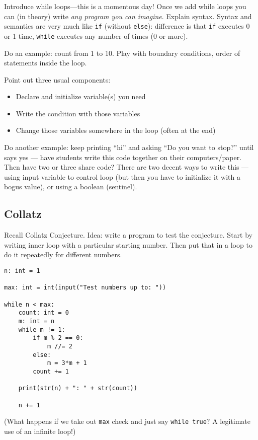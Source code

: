 \documentclass{article}
\begin{document}
Introduce while loops---this is a momentous day!  Once we add while
loops you can (in theory) write \emph{any program you can imagine}.
Explain syntax.  Syntax and semantics are very much like \verb|if|
(without \verb|else|): difference is that \verb|if| executes 0 or 1
time, \verb|while| executes any number of times (0 or more).

Do an example: count from 1 to 10.  Play with boundary conditions,
order of statements inside the loop.

Point out three usual components:
\begin{itemize}
\item Declare and initialize variable(s) you need
\item Write the condition with those variables
\item Change those variables somewhere in the loop (often at the
  end)
\end{itemize}

Do another example: keep printing ``hi'' and asking ``Do you want to
stop?'' until says yes --- have students write this code together on
their computers/paper.  Then have two or three share code?  There are
two decent ways to write this --- using input variable to control loop
(but then you have to initialize it with a bogus value), or using a
boolean (sentinel).

\subsection*{Collatz}

Recall Collatz Conjecture.  Idea: write a program to test the
conjecture.  Start by writing inner loop with a particular starting
number.  Then put that in a loop to do it repeatedly for different
numbers.

\begin{verbatim}
n: int = 1

max: int = int(input("Test numbers up to: "))

while n < max:
    count: int = 0
    m: int = n
    while m != 1:
        if m % 2 == 0:
            m //= 2
        else:
            m = 3*m + 1
        count += 1

    print(str(n) + ": " + str(count))

    n += 1
\end{verbatim}

(What happens if we take out \verb|max| check and just say
\verb|while true|?  A legitimate use of an infinite loop!)
\end{document}
